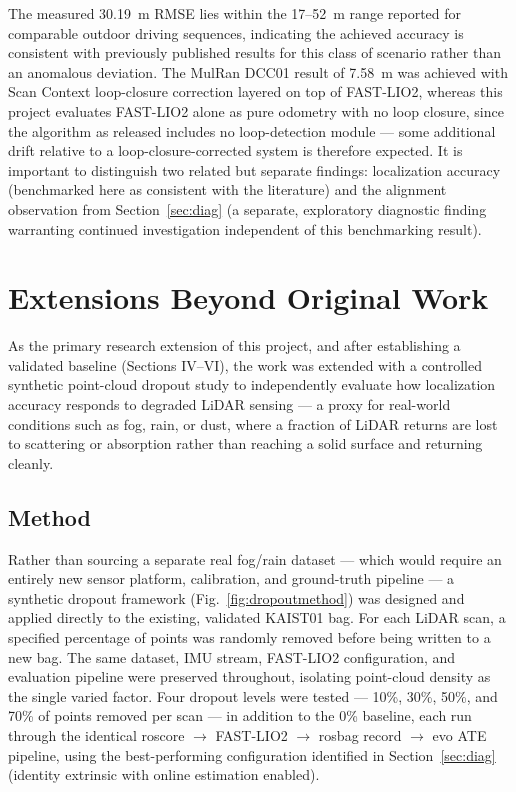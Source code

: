 \documentclass[conference]{IEEEtran}
\begin{document}
The measured 30.19~m RMSE lies within the 17--52~m range reported for comparable outdoor driving sequences, indicating the achieved accuracy is consistent with previously published results for this class of scenario rather than an anomalous deviation. The MulRan DCC01 result of 7.58~m was achieved with Scan Context loop-closure correction layered on top of FAST-LIO2, whereas this project evaluates FAST-LIO2 alone as pure odometry with no loop closure, since the algorithm as released includes no loop-detection module --- some additional drift relative to a loop-closure-corrected system is therefore expected. It is important to distinguish two related but separate findings: localization accuracy (benchmarked here as consistent with the literature) and the alignment observation from Section~\ref{sec:diag} (a separate, exploratory diagnostic finding warranting continued investigation independent of this benchmarking result).

\section{Extensions Beyond Original Work}
\label{sec:extensions}
As the primary research extension of this project, and after establishing a validated baseline (Sections IV--VI), the work was extended with a controlled synthetic point-cloud dropout study to independently evaluate how localization accuracy responds to degraded LiDAR sensing --- a proxy for real-world conditions such as fog, rain, or dust, where a fraction of LiDAR returns are lost to scattering or absorption rather than reaching a solid surface and returning cleanly.

\subsection{Method}
Rather than sourcing a separate real fog/rain dataset --- which would require an entirely new sensor platform, calibration, and ground-truth pipeline --- a synthetic dropout framework (Fig.~\ref{fig:dropoutmethod}) was designed and applied directly to the existing, validated KAIST01 bag. For each LiDAR scan, a specified percentage of points was randomly removed before being written to a new bag. The same dataset, IMU stream, FAST-LIO2 configuration, and evaluation pipeline were preserved throughout, isolating point-cloud density as the single varied factor. Four dropout levels were tested --- 10\%, 30\%, 50\%, and 70\% of points removed per scan --- in addition to the 0\% baseline, each run through the identical roscore $\rightarrow$ FAST-LIO2 $\rightarrow$ rosbag record $\rightarrow$ evo ATE pipeline, using the best-performing configuration identified in Section~\ref{sec:diag} (identity extrinsic with online estimation enabled).
\end{document}
